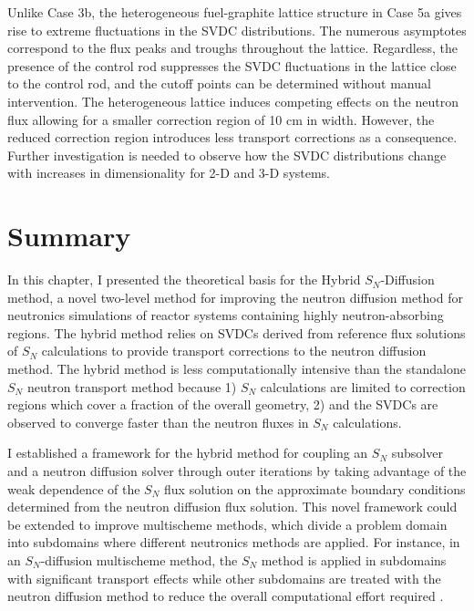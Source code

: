 Unlike Case 3b, the heterogeneous fuel-graphite lattice structure in Case 5a gives rise to
extreme fluctuations in the \gls{SVDC} distributions. The numerous asymptotes correspond to the
flux peaks and troughs throughout the lattice. Regardless, the presence of the control rod
suppresses the \gls{SVDC} fluctuations in the lattice close to the control rod, and the cutoff
points can be determined without manual intervention. The heterogeneous lattice induces competing
effects on the neutron flux allowing for a smaller correction region of 10 cm in width. However,
the reduced correction region introduces less transport corrections as a consequence.
Further investigation is needed to observe how the \gls{SVDC} distributions change with
increases in dimensionality for 2-D and 3-D systems.

\section{Summary} \label{sec:hybrid-summary}

In this chapter, I presented the theoretical basis for the Hybrid $S_N$-Diffusion method, a novel
two-level method for improving the neutron diffusion method for neutronics simulations of reactor
systems containing highly neutron-absorbing regions. The hybrid method relies on \glspl{SVDC}
derived from reference flux solutions of $S_N$ calculations to provide transport
corrections to the neutron diffusion method. The hybrid method is less computationally intensive
than the standalone $S_N$ neutron transport method because 1) $S_N$ calculations are limited to
correction regions which cover a fraction of the overall geometry, 2) and the \glspl{SVDC} are
observed to converge faster than the neutron fluxes in $S_N$ calculations.

I established a framework for the hybrid method for coupling an $S_N$ subsolver and a neutron
diffusion solver through outer iterations by taking advantage of the weak dependence of the $S_N$
flux solution on the approximate boundary conditions determined from the neutron diffusion flux
solution. This novel framework could be extended to improve multischeme methods, which
divide a problem domain into subdomains where different neutronics methods are applied. For
instance, in an $S_N$-diffusion multischeme method, the $S_N$ method is applied in subdomains with
significant transport effects while other subdomains are treated with the neutron diffusion method
to reduce the overall computational effort required \cite{wang_rattlesnake_2021}. 

